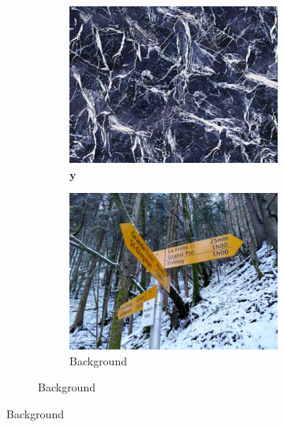 \begin{figure}[]
    \centering    
    \begin{subfigure}{\textwidth}
        \centering
        \begin{subfigure}{0.24\textwidth}
            \centering
            \includegraphics[width=\textwidth]{images/04-experiment02/photo/marble/target.jpg}
            \caption*{\(\bm{y}\)}
        \end{subfigure}
        \hfill
        \begin{subfigure}{0.24\textwidth}
            \centering
            \includegraphics[width=\textwidth]{images/04-experiment02/photo/bg.jpg}
            \caption*{Background}

\end{subfigure}
\end{subfigure}
\end{figure}
